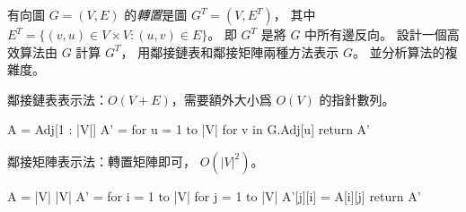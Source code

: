 \startEXERCISE
有向圖 $G=(V,E)$ 的\emph{轉置}是圖 $G^T=(V,E^T)$，
其中 $E^T=\{(v,u)\in V \times V:(u,v)\in E\}$。
即 $G^T$ 是將 $G$ 中所有邊反向。
設計一個高效算法由 $G$ 計算 $G^T$，
用鄰接鏈表和鄰接矩陣兩種方法表示 $G$。
並分析算法的複雜度。
\stopEXERCISE

\startANSWER
鄰接鏈表表示法：$O(V+E)$，需要額外大小爲 $O(V)$ 的指針數列。

\startCLRSCODE
A = Adj[1 : |V|]
A' = 
for u = 1 to |V|
	for  v in G.Adj[u]
return A'
\stopCLRSCODE

鄰接矩陣表示法：轉置矩陣即可， $O(|V|^2)$。

\startCLRSCODE
A = |V| \times |V|
A' = 
for i = 1 to |V|
	for j = 1 to |V|
		A'[j][i] = A[i][j]
return A'
\stopCLRSCODE

\stopANSWER
